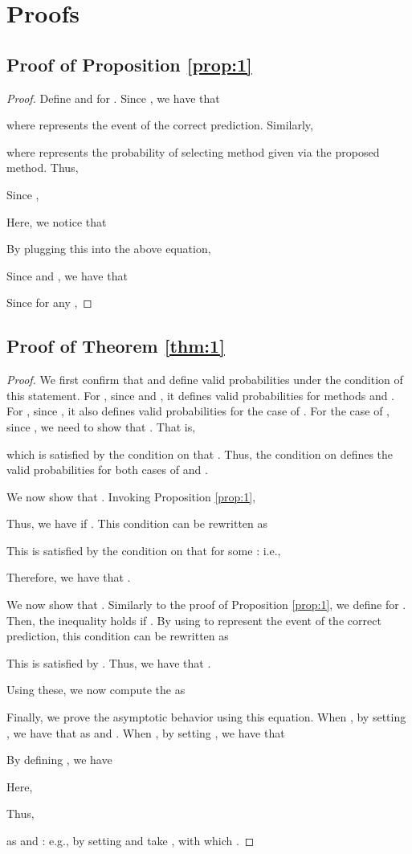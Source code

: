 \documentclass[11pt]{article}
\begin{document}
\section{Proofs} \label{app:proofs}
\subsection{Proof of Proposition \ref{prop:1}}
\begin{proof}
Define  and  for . Since , we have that

where  represents the event of the correct prediction. Similarly,
  
where  represents the probability of selecting method   given  via the proposed method. Thus, 
  
Since , 

Here, we notice that 

By plugging this into the above equation,
  
Since  and , we have that 
 
Since  for any , 
 

  
\end{proof}

\subsection{Proof of Theorem \ref{thm:1}}
\begin{proof}
We first confirm that  and  define valid probabilities under the condition of this statement.  For , since  and , it defines valid probabilities for methods  and . For  , since , it also defines valid probabilities for  the case of . For the case of , since , we need to show that . That is, 
   
which is satisfied by the condition on  that . Thus,  the condition on  defines the valid probabilities for both cases of   and  .

We now show that    . 
Invoking Proposition \ref{prop:1}, 
  
Thus, we have    if . This condition can be rewritten as

This  is satisfied by the condition on  that   for some : i.e., 

Therefore, 
we have that    . 

We now show that . Similarly to the proof of Proposition \ref{prop:1}, we define   for . Then, the inequality   holds if  . By using   to represent the event of the correct prediction, this condition can be rewritten as
   
This is satisfied by .
Thus, we have that  .

Using these, we now compute the  as 

Finally, we prove  the asymptotic behavior
using this equation. When , by setting , we have that 
as  and . When , by setting , we have that 

By defining , we have 

Here, 

Thus, 

as  and : e.g., by setting  and take , with which .   
\end{proof}
\end{document}
